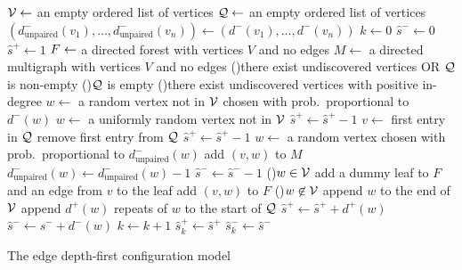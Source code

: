 \begin{algorithm}[htbp]
    \SetAlgoLined
    $\mathcal V \leftarrow$ an empty ordered list of vertices \;
    $\mathcal Q \leftarrow$ an empty ordered list of vertices \;
    $(d^-_{\mathrm{unpaired}}(v_1),\dots,d^-_{\mathrm{unpaired}}(v_n))\leftarrow (d^-(v_1),\dots,d^-(v_n))$  \;
    $k \leftarrow 0$  \;
    $\hat{s}^- \leftarrow 0$ \;
    $\hat{s}^+ \leftarrow 1$  \;
    $F \leftarrow$ a directed forest with vertices $V$ and no edges
    \;
     $M \leftarrow$ a directed multigraph with vertices $V$ and no edges
    \;
    \While(){there exist undiscovered vertices OR $\mathcal Q$ is non-empty}{
        \eIf(){$\mathcal Q$ is empty}{
            \eIf(){there exist undiscovered vertices with positive in-degree}{
            $w\leftarrow$ a random vertex not in $\mathcal V$ chosen with prob.\ proportional to $d^-(w)$ \;}
            {$w\leftarrow$ a uniformly random vertex not in $\mathcal V$}
            $\hat{s}^+\leftarrow \hat{s}^+-1$\;}{
            $v \leftarrow$ first entry in $\mathcal Q$ \;
            remove first entry from $\mathcal Q$ \;
            $\hat{s}^+\leftarrow \hat{s}^+-1$\;
            $w \leftarrow$ a random vertex chosen with prob.\ proportional to $d^-_{\mathrm{unpaired}}(w)$ \;
            add $(v,w)$ to $M$\;
            $d^-_{\mathrm{unpaired}}(w)\leftarrow d^-_{\mathrm{unpaired}}(w)-1$\;
            $\hat{s}^-\leftarrow \hat{s}^--1$\;
            \eIf(){$w\in \mathcal V$}{
            add a dummy leaf to $F$ and an edge from $v$ to the leaf\;}{
            add $(v,w)$ to $F$\;
            }
        }
        \If(){$w\not\in \mathcal V$}{
        append $w$ to the end of $\mathcal V$ \;
        append $d^+(w)$ repeats of $w$ to the start of $\mathcal Q$\;
        $\hat{s}^+\leftarrow \hat{s}^++d^+(w)$\;
        $\hat{s}^-\leftarrow \hat{s}^-+d^-(w)$\;
        }
        $k\leftarrow k+1$\;
        $\hat{s}^+_k\leftarrow \hat{s}^+$\;
        $\hat{s}^-_k\leftarrow \hat{s}^-$ \;
        }
    
    
    \caption{The edge depth-first configuration model \label{alg:edfs}}
\end{algorithm}
